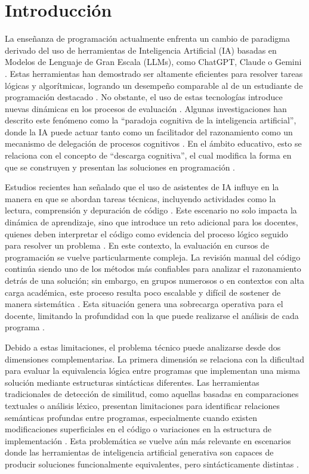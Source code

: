 \chapter{Introducción}

La enseñanza de programación actualmente enfrenta un cambio de paradigma derivado del uso de herramientas de Inteligencia Artificial (IA) basadas en Modelos de Lenguaje de Gran Escala (LLMs), como ChatGPT, Claude o Gemini \cite{Jose2025Cognitive}. Estas herramientas han demostrado ser altamente eficientes para resolver tareas lógicas y algorítmicas, logrando un desempeño comparable al de un estudiante de programación destacado \cite{Jose2025Cognitive}. No obstante, el uso de estas tecnologías introduce nuevas dinámicas en los procesos de evaluación \cite{Jose2025Cognitive}. Algunas investigaciones han descrito este fenómeno como la ``paradoja cognitiva de la inteligencia artificial'', donde la IA puede actuar tanto como un facilitador del razonamiento como un mecanismo de delegación de procesos cognitivos \cite{Jose2025Cognitive}. En el ámbito educativo, esto se relaciona con el concepto de ``descarga cognitiva'', el cual modifica la forma en que se construyen y presentan las soluciones en programación \cite{Jose2025Cognitive}.

Estudios recientes han señalado que el uso de asistentes de IA influye en la manera en que se abordan tareas técnicas, incluyendo actividades como la lectura, comprensión y depuración de código \cite{Shen2026Skill}. Este escenario no solo impacta la dinámica de aprendizaje, sino que introduce un reto adicional para los docentes, quienes deben interpretar el código como evidencia del proceso lógico seguido para resolver un problema \cite{Shen2026Skill}. En este contexto, la evaluación en cursos de programación se vuelve particularmente compleja. La revisión manual del código continúa siendo uno de los métodos más confiables para analizar el razonamiento detrás de una solución; sin embargo, en grupos numerosos o en contextos con alta carga académica, este proceso resulta poco escalable y difícil de sostener de manera sistemática \cite{Shen2026Skill}. Esta situación genera una sobrecarga operativa para el docente, limitando la profundidad con la que puede realizarse el análisis de cada programa \cite{Shen2026Skill}.

Debido a estas limitaciones, el problema técnico puede analizarse desde dos dimensiones complementarias. La primera dimensión se relaciona con la dificultad para evaluar la equivalencia lógica entre programas que implementan una misma solución mediante estructuras sintácticas diferentes. Las herramientas tradicionales de detección de similitud, como aquellas basadas en comparaciones textuales o análisis léxico, presentan limitaciones para identificar relaciones semánticas profundas entre programas, especialmente cuando existen modificaciones superficiales en el código o variaciones en la estructura de implementación \cite{Mekterovic2023Scaling}. Esta problemática se vuelve aún más relevante en escenarios donde las herramientas de inteligencia artificial generativa son capaces de producir soluciones funcionalmente equivalentes, pero sintácticamente distintas \cite{Mekterovic2023Scaling}.

